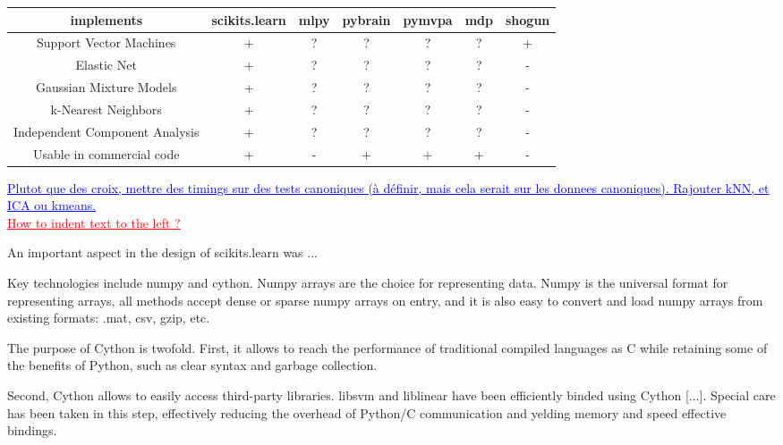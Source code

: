 \documentclass[twoside,11pt]{article}
\newcommand{\GAEL}[1]{\textcolor{blue}{\uline{#1}}}
\newcommand{\FABIAN}[1]{\textcolor{red}{\uline{#1}}}
\begin{document}
\begin{center}


\begin{tabular}{c c c c c c c}
\hline\hline %
implements & scikits.learn & mlpy & pybrain & pymvpa &  mdp & shogun \\ [0.5ex]
\hline
Support Vector Machines        & + & ?   & ?       &  ?     & ?    & + \\
Elastic Net & + & ?   & ?       &  ?     & ?    & - \\
Gaussian Mixture Models  & + & ?   & ?       &  ?     & ?    & - \\
k-Nearest Neighbors & + & ?   & ?       &  ?     & ?    & - \\
Independent Component Analysis & + & ?   & ?       &  ?     & ?    & - \\
Usable in commercial code &  + & -   & +       &  +     & +    & - \\
\hline
\end{tabular}
\GAEL{Plutot que des croix, mettre des timings sur des tests canoniques (à 
définir, mais cela serait sur les donnees canoniques). Rajouter kNN, et
ICA ou kmeans.}\\
\FABIAN{How to indent text to the left ?}
\end{center}

An important aspect in the design of scikits.learn was ...

Key technologies include numpy and cython. Numpy arrays are the choice for
representing data. Numpy is the universal format for representing
arrays, all methods accept dense or sparse numpy arrays on entry, and
it is also easy to convert and load numpy arrays from existing formats:
.mat, csv, gzip, etc.

The purpose of Cython is twofold. First, it allows to reach the
performance of traditional compiled languages as C while retaining
some of the benefits of Python, such as clear syntax and garbage
collection.

Second, Cython allows to easily access third-party libraries. libsvm
and liblinear have been efficiently binded using Cython [...]. Special
care has been taken in this step, effectively reducing the overhead of
Python/C communication and yelding memory and speed effective bindings.

\end{document}
